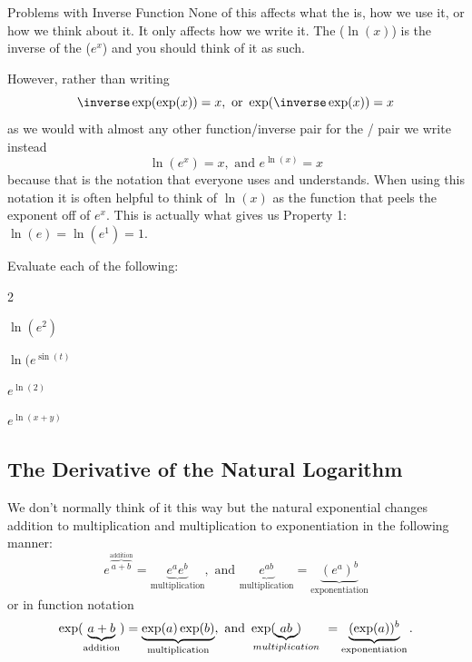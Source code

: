 \begin{center}
\begin{minipage}[h]{.85\linewidth}
\begin{mynotation}{Problems with Inverse Function}
      None of this affects what the  is, how
      we use it, or how we think about it. It only affects how we
      write it. The  ($\ln(x)$) is the inverse of the  ($e^x$) and you should think of it as such.

      However, rather than writing
      $$
      \inverse\exp(\exp(x))=x, \text{  or  } \exp(\inverse\exp(x))=x
      $$
      as we would with almost any other function/inverse pair for the
      / pair we
      write instead
      $$
      \ln(e^x)=x, \text{  and  } e^{\ln(x)}=x
      $$
      because that is the notation that everyone uses and
      understands. When using this notation it is often helpful to
      think of $\ln(x)$ as the function that peels the exponent off of
      $e^x$. This is actually what gives us Property 1:
      $\ln(e)=\ln(e^1)=1$.

\end{mynotation}
\end{minipage}
\end{center}

\begin{ProficiencyDrill}
  Evaluate each of the following:
  \begin{enumerate}[label={\bf{}(\alph*)}]
    \begin{multicols}{2}
    \item $\ln(e^2)$ 
    \item $\ln(e^{\sin(t)}$ 
    \item $e^{\ln(2)}$ 
    \item $e^{\ln(x+y)}$ 
    \end{multicols}
  \end{enumerate}
\end{ProficiencyDrill}


\subsection*{The Derivative of the Natural Logarithm}
We don't normally  think of it this way but  the natural exponential
changes addition to multiplication and multiplication to
exponentiation in the following manner:
\begin{equation}
e^{\overbrace{a+b}^{\text{addition}}}=\underbrace{e^ae^b}_{\text{multiplication}},\text{ and } \underbrace{e^{ab}}_{\text{multiplication}}=\underbrace{(e^a)^b}_{\text{exponentiation}}\label{eq:ExpDefProp}
\end{equation}
or in function notation
$$
\exp(\underbrace{a+b}_{\text{addition}})=\underbrace{\exp(a)\exp(b)}_{\text{multiplication}},\text{
  and
} \exp(\hskip-.25in\underbrace{ab}_{multiplication}\hskip-.25in)\hskip.25in=\underbrace{(\exp(a))^b}_{\text{exponentiation}}.
$$

